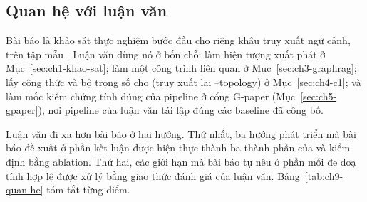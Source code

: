 \subsection{Quan hệ với luận văn}
\label{sec:ch9-quan-he}

Bài báo là khảo sát thực nghiệm bước đầu cho riêng khâu truy xuất ngữ cảnh, trên tập mẫu . Luận văn dùng nó ở bốn chỗ: làm hiện tượng xuất phát ở Mục~\ref{sec:ch1-khao-sat}; làm một công trình liên quan ở Mục~\ref{sec:ch3-graphrag}; lấy công thức và bộ trọng số  cho  (truy xuất lai --topology) ở Mục~\ref{sec:ch4-c1}; và làm mốc kiểm chứng tính đúng của pipeline ở cổng G-paper (Mục~\ref{sec:ch5-gpaper}), nơi pipeline của luận văn tái lập đúng các baseline đã công bố.

Luận văn đi xa hơn bài báo ở hai hướng. Thứ nhất, ba hướng phát triển mà bài báo đề xuất ở phần kết luận được hiện thực thành ba thành phần của \CTAV{} và kiểm định bằng ablation. Thứ hai, các giới hạn mà bài báo tự nêu ở phần mối đe doạ tính hợp lệ được xử lý bằng giao thức đánh giá của luận văn. Bảng~\ref{tab:ch9-quan-he} tóm tắt từng điểm.

